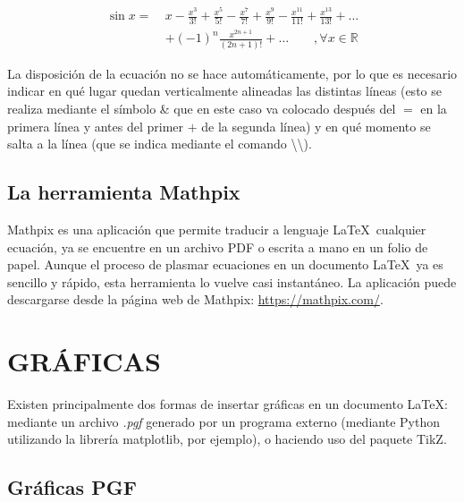 \documentclass[a4paper, 11pt, spanish, twoside]{article}
\begin{document}
\begin{equation}
\begin{split}
    \sin{x} = \ & x - \frac{x^3}{3!} + \frac{x^5}{5!} - \frac{x^7}{7!} + \frac{x^9}{9!} - \frac{x^{11}}{11!} + \frac{x^13}{13!} + \dots \\ & + (-1)^n \frac{x^{2n+1}}{(2n+1)!} + \dots \qquad , \forall x \in \mathbb{R}
    \label{eq:taylor}
\end{split}
\end{equation}

La disposición de la ecuación no se hace automáticamente, por lo que es necesario indicar en qué lugar quedan verticalmente alineadas las distintas líneas (esto se realiza mediante el símbolo \& que en este caso va colocado después del $=$ en la primera línea y antes del primer $+$ de la segunda línea) y en qué momento se salta a la línea (que se indica mediante el comando \textbackslash\textbackslash).


\subsection{La herramienta Mathpix}

Mathpix es una aplicación que permite traducir a lenguaje \LaTeX \ cualquier ecuación, ya se encuentre en un archivo PDF o escrita a mano en un folio de papel. Aunque el proceso de plasmar ecuaciones en un documento \LaTeX \ ya es sencillo y rápido, esta herramienta lo vuelve casi instantáneo. La aplicación puede descargarse desde la página web de Mathpix: \url{https://mathpix.com/}.




\newpage
\section{GRÁFICAS} \label{sec:graficas}

Existen principalmente dos formas de insertar gráficas en un documento \LaTeX: mediante un archivo \textit{.pgf} generado por un programa externo (mediante Python utilizando la librería matplotlib, por ejemplo), o haciendo uso del paquete TikZ.


\subsection{Gráficas PGF}
\end{document}

